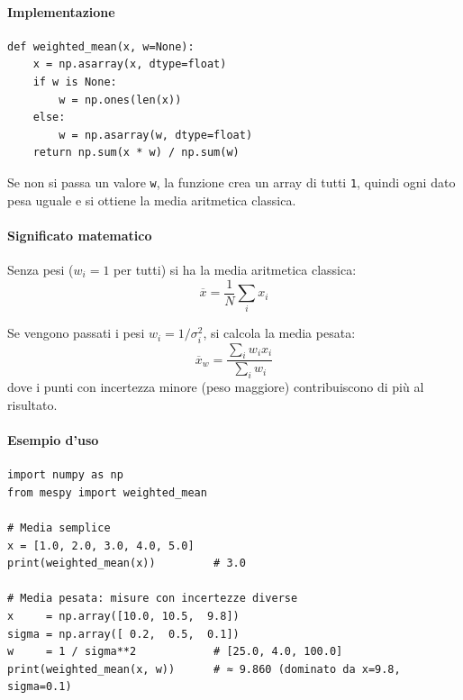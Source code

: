\paragraph{Implementazione}
\begin{verbatim}
def weighted_mean(x, w=None):
    x = np.asarray(x, dtype=float)
    if w is None:
        w = np.ones(len(x))
    else:
        w = np.asarray(w, dtype=float)
    return np.sum(x * w) / np.sum(w)
\end{verbatim}
Se non si passa un valore \texttt{w}, la funzione crea un array di tutti \texttt{1},
quindi ogni dato pesa uguale e si ottiene la media aritmetica classica.

\paragraph{Significato matematico}
Senza pesi ($w_i = 1$ per tutti) si ha la media aritmetica classica:
$$\overline{x} = \frac{1}{N} \sum_i x_i$$

Se vengono passati i pesi $w_i = 1/\sigma_i^2$, si calcola la media pesata:
$$\overline{x}_w = \frac{\sum_i w_i x_i}{\sum_i w_i}$$
dove i punti con incertezza minore (peso maggiore) contribuiscono di più al risultato.

\paragraph{Esempio d'uso}
\begin{verbatim}
import numpy as np
from mespy import weighted_mean

# Media semplice
x = [1.0, 2.0, 3.0, 4.0, 5.0]
print(weighted_mean(x))         # 3.0

# Media pesata: misure con incertezze diverse
x     = np.array([10.0, 10.5,  9.8])
sigma = np.array([ 0.2,  0.5,  0.1])
w     = 1 / sigma**2            # [25.0, 4.0, 100.0]
print(weighted_mean(x, w))      # ≈ 9.860 (dominato da x=9.8, sigma=0.1)
\end{verbatim}

